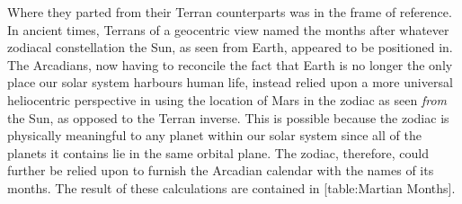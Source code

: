 Where they parted from their Terran counterparts was in the frame of reference. In ancient times, Terrans of a geocentric view named the months after whatever zodiacal constellation the Sun, as seen from Earth, appeared to be positioned in. The Arcadians, now having to reconcile the fact that Earth is no longer the only place our solar system harbours human life, instead relied upon a more universal heliocentric perspective in using the location of Mars in the zodiac as seen {\it from} the Sun, as opposed to the Terran inverse. This is possible because the zodiac is physically meaningful to any planet within our solar system since all of the planets it contains lie in the same orbital plane. The zodiac, therefore, could further be relied upon to furnish the Arcadian calendar with the names of its months. The result of these calculations are contained in [table:Martian Months].
\crlf

